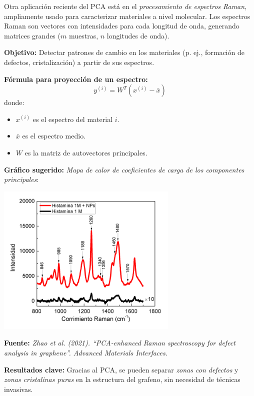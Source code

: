 \documentclass[12pt]{article}
\begin{document}
\noindent
Otra aplicación reciente del PCA está en el \emph{procesamiento de espectros Raman}, ampliamente usado para caracterizar materiales a nivel molecular. Los espectros Raman son vectores con intensidades para cada longitud de onda, generando matrices grandes (\( m \) muestras, \( n \) longitudes de onda).

\noindent
\textbf{Objetivo:} Detectar patrones de cambio en los materiales (p. ej., formación de defectos, cristalización) a partir de sus espectros.

\vspace{1em}
\noindent
\textbf{Fórmula para proyección de un espectro:}
\[
y^{(i)} = W^T (x^{(i)} - \bar{x})
\]
donde:
\begin{itemize}
	\item \( x^{(i)} \) es el espectro del material \( i \).
	\item \( \bar{x} \) es el espectro medio.
	\item \( W \) es la matriz de autovectores principales.
\end{itemize}

\vspace{1em}
\noindent
\textbf{Gráfico sugerido:} \emph{Mapa de calor de coeficientes de carga de los componentes principales}:
\begin{center}
	\includegraphics[width=0.65\textwidth]{imagenes/pca_raman_heatmap.png}
\end{center}

\noindent
\textbf{Fuente:} \emph{Zhao et al. (2021). ``PCA-enhanced Raman spectroscopy for defect analysis in graphene''. Advanced Materials Interfaces.}

\vspace{1em}
\noindent
\textbf{Resultados clave:} Gracias al PCA, se pueden separar \emph{zonas con defectos} y \emph{zonas cristalinas puras} en la estructura del grafeno, sin necesidad de técnicas invasivas.
\end{document}
